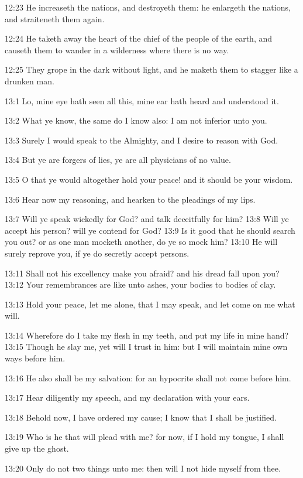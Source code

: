 12:23 He increaseth the nations, and destroyeth them: he enlargeth the
nations, and straiteneth them again.

12:24 He taketh away the heart of the chief of the people of the
earth, and causeth them to wander in a wilderness where there is no
way.

12:25 They grope in the dark without light, and he maketh them to
stagger like a drunken man.

13:1 Lo, mine eye hath seen all this, mine ear hath heard and
understood it.

13:2 What ye know, the same do I know also: I am not inferior unto
you.

13:3 Surely I would speak to the Almighty, and I desire to reason with
God.

13:4 But ye are forgers of lies, ye are all physicians of no value.

13:5 O that ye would altogether hold your peace! and it should be your
wisdom.

13:6 Hear now my reasoning, and hearken to the pleadings of my lips.

13:7 Will ye speak wickedly for God? and talk deceitfully for him?
13:8 Will ye accept his person? will ye contend for God?  13:9 Is it
good that he should search you out? or as one man mocketh another, do
ye so mock him?  13:10 He will surely reprove you, if ye do secretly
accept persons.

13:11 Shall not his excellency make you afraid? and his dread fall
upon you?  13:12 Your remembrances are like unto ashes, your bodies to
bodies of clay.

13:13 Hold your peace, let me alone, that I may speak, and let come on
me what will.

13:14 Wherefore do I take my flesh in my teeth, and put my life in
mine hand?  13:15 Though he slay me, yet will I trust in him: but I
will maintain mine own ways before him.

13:16 He also shall be my salvation: for an hypocrite shall not come
before him.

13:17 Hear diligently my speech, and my declaration with your ears.

13:18 Behold now, I have ordered my cause; I know that I shall be
justified.

13:19 Who is he that will plead with me? for now, if I hold my tongue,
I shall give up the ghost.

13:20 Only do not two things unto me: then will I not hide myself from
thee.

